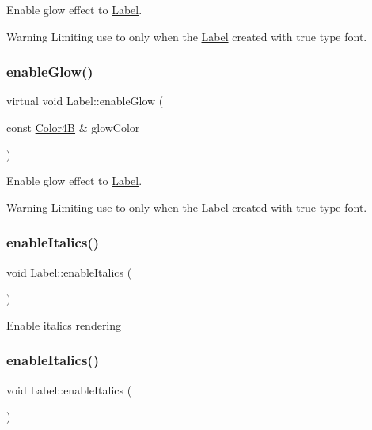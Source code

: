 Enable glow effect to \hyperlink{classLabel}{Label}. \begin{DoxyWarning}{Warning}
Limiting use to only when the \hyperlink{classLabel}{Label} created with true type font. 
\end{DoxyWarning}
\mbox{\label{classLabel_a209fd3cf08d9ae26bda7c91f9b4c67a8}} 
\subsubsection{\texorpdfstring{enable\+Glow()}{enableGlow()}\hspace{0.1cm}{\footnotesize\ttfamily [2/2]}}
{\footnotesize\ttfamily virtual void Label\+::enable\+Glow (\begin{DoxyParamCaption}\item[{const \hyperlink{structColor4B}{Color4B} \&}]{glow\+Color }\end{DoxyParamCaption})\hspace{0.3cm}{\ttfamily [virtual]}}

Enable glow effect to \hyperlink{classLabel}{Label}. \begin{DoxyWarning}{Warning}
Limiting use to only when the \hyperlink{classLabel}{Label} created with true type font. 
\end{DoxyWarning}
\mbox{\label{classLabel_a95ad191f37a92e4a72013cd4183726fe}} 
\subsubsection{\texorpdfstring{enable\+Italics()}{enableItalics()}\hspace{0.1cm}{\footnotesize\ttfamily [1/2]}}
{\footnotesize\ttfamily void Label\+::enable\+Italics (\begin{DoxyParamCaption}{ }\end{DoxyParamCaption})}

Enable italics rendering \mbox{\label{classLabel_a95ad191f37a92e4a72013cd4183726fe}} 
\subsubsection{\texorpdfstring{enable\+Italics()}{enableItalics()}\hspace{0.1cm}{\footnotesize\ttfamily [2/2]}}
{\footnotesize\ttfamily void Label\+::enable\+Italics (\begin{DoxyParamCaption}{ }\end{DoxyParamCaption})}


